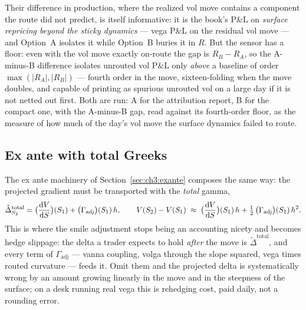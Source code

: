 \documentclass[11pt]{book}
\theoremstyle{plain}
\theoremstyle{definition}
\theoremstyle{remark}
\newcommand{\Gadj}{\Gamma_{\mathrm{adj}}}        %
\newcommand{\dd}{\mathrm{d}}                                  %
\newcommand{\td}[2]{\frac{\dd #1}{\dd #2}}                    %
\begin{document}
Their difference in production, where the realized vol move contains
a component the route did not predict, is itself informative: it is the
book's P\&L on \emph{surface repricing beyond the sticky dynamics} --- vega
P\&L on the residual vol move --- and Option~A isolates it while Option~B
buries it in $R$. But the sensor has a floor: even with the vol move exactly
on-route the gap is $R_B - R_A$, so the A-minus-B difference isolates
unrouted vol P\&L only \emph{above} a baseline of order
$\max(|R_A|, |R_B|)$ --- fourth order in the move, sixteen-folding when the
move doubles, and capable of printing as spurious unrouted vol on a large
day if it is not netted out first. Both are run: A for the attribution
report, B for the compact one, with the A-minus-B gap, read against its
fourth-order floor, as the measure of how much of the day's vol move the
surface dynamics failed to route.

\subsection{Ex ante with total Greeks}\label{sec:ch3:exante-total}

The ex ante machinery of Section~\ref{sec:ch3:exante} composes the same way:
the projected gradient must be transported with the \emph{total} gamma,
\begin{equation}\label{eq:ch3:exante-total}
  \tilde{\Delta}_{S_2}^{\mathrm{total}}
  = \evalat{\td{V}{S}}{S_1} + \evalat{\Gadj}{S_1}\, h,
  \qquad
  V(S_2) - V(S_1)
  \;\approx\;
  \evalat{\td{V}{S}}{S_1}\, h
  + \tfrac{1}{2}\,\evalat{\Gadj}{S_1}\, h^2 .
\end{equation}
This is where the smile adjustment stops being an accounting nicety and
becomes hedge slippage: the delta a trader expects to hold \emph{after} the
move is $\tilde{\Delta}^{\mathrm{total}}$, and every term of $\Gadj$ ---
vanna coupling, volga through the slope squared, vega times routed curvature
--- feeds it. Omit them and the projected delta is systematically wrong by an
amount growing linearly in the move and in the steepness of the surface; on a
desk running real vega this is rehedging cost, paid daily, not a rounding
error.
\end{document}
